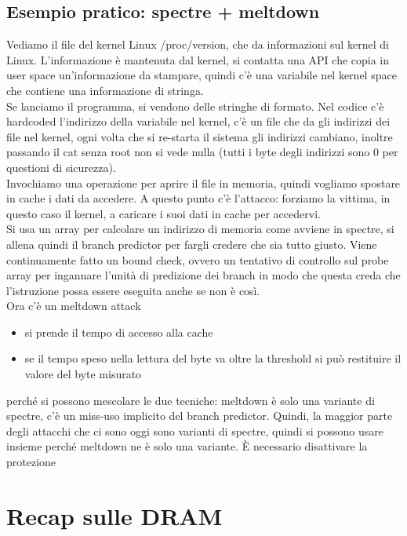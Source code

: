 \documentclass[12pt, oneside]{extbook} %
\begin{document}
\section*{Esempio pratico: spectre + meltdown}
Vediamo il file del kernel Linux \textsf{/proc/version}, che da informazioni sul kernel di Linux. L'informazione è mantenuta dal kernel, si contatta una API che copia in user space un'informazione da stampare, quindi c'è una variabile nel kernel space che contiene una informazione di stringa.\\Se lanciamo il programma, si vendono delle stringhe di formato. Nel codice c'è hardcoded l'indirizzo della variabile nel kernel, c'è un file che da gli indirizzi dei file nel kernel, ogni volta che si re-starta il sistema gli indirizzi cambiano, inoltre passando il cat senza root non si vede nulla (tutti i byte degli indirizzi sono 0 per questioni di sicurezza).\\ Invochiamo una operazione per aprire il file in memoria, quindi vogliamo spostare in cache i dati da accedere. A questo punto c'è l'attacco: forziamo la vittima, in questo caso il kernel, a caricare i suoi dati in cache per accedervi.\\Si usa un array per calcolare un indirizzo di memoria come avviene in spectre, si allena quindi il branch predictor per fargli credere che sia tutto giusto. Viene continuamente fatto un bound check, ovvero un tentativo di controllo sul probe array per ingannare l'unità di predizione dei branch in modo che questa creda che l'istruzione possa essere eseguita anche se non è così.\\Ora c'è un meltdown attack
\begin{itemize}
\item si prende il tempo di accesso alla cache
\item se il tempo speso nella lettura del byte va oltre la threshold si può restituire il valore del byte misurato
\end{itemize}
perché si possono mescolare le due tecniche: meltdown è solo una variante di spectre, c'è un miss-uso implicito del branch predictor. Quindi, la maggior parte degli attacchi che ci sono oggi sono varianti di spectre, quindi si possono usare insieme perché meltdown ne è solo una variante. È necessario disattivare la protezione
\chapter{Recap sulle DRAM}
\end{document}
